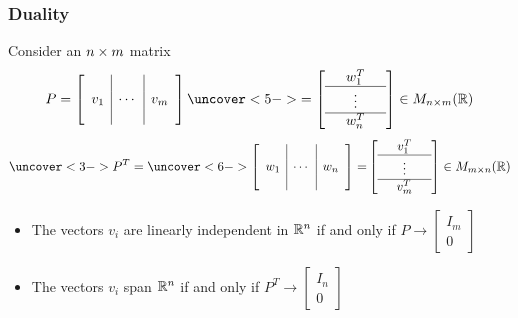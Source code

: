 \documentclass[9pt]{beamer}
\begin{document}
\begin{frame}[t]
 \frametitle{Duality}
 
 Consider an $n\times m$ matrix
 \[ P = 
     \left[\begin{array}{c|c|c}
      && \\ v_1 & \cdots & v_m \\ &&
     \end{array}\right] \uc<5->{= 
     \left[\begin{array}{ccc}
      & w_1^T & \\ \hline 
      & \vdots & \\ \hline
      & w_n^T & 
     \end{array}\right]} \in M_{n\tm m}(\R)
 \]
 \[ \uc<3->{P^T = 
     \uc<6->{\left[\begin{array}{c|c|c}
      && \\ w_1 & \cdots & w_n \\ &&
     \end{array}\right] =} 
     \left[\begin{array}{ccc}
      & v_1^T & \\ \hline 
      & \vdots & \\ \hline
      & v_m^T & 
     \end{array}\right] \in M_{m\tm n}(\R)}
 \]
 \begin{itemize}
  \item<2-> The vectors $v_i$ are linearly independent in ${\mathbb{R}}^n$
   if and only if  
   $P\to\left[\begin{array}{c}I_m\\\hline 0\end{array}\right]$
  \item<4-> The vectors $v_i$ span ${\mathbb{R}}^n$
   if and only if  
   $P^T\to\left[\begin{array}{c}I_n\\\hline 0\end{array}\right]$
 \end{itemize}

\end{frame}
\end{document}
